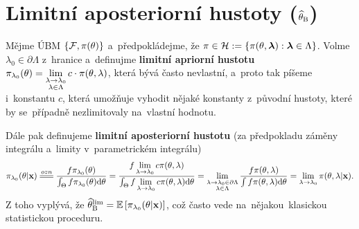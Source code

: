 \section{Limitní aposteriorní hustoty ($\widehat{\theta}_\mathrm{B}$)}
\begin{define}
	Mějme ÚBM $\{\mathcal{F},\pi(\theta)\}$ a~předpokládejme, že $\pi\in\mathcal{H}:=\{\pi(\theta,\boldsymbol{\lambda}):\boldsymbol{\lambda}\in\Lambda\}$. Volme $\lambda_0\in\partial\Lambda$ z~hranice a~definujme \textbf{limitní apriorní hustotu} $\pi_{\lambda_0}(\theta)=\lim\limits_{\substack{
			\lambda\to\lambda_0\\\lambda\in\Lambda	}
	}c\cdot \pi(\theta,\lambda)$, která bývá často nevlastní, a~proto tak píšeme i~konstantu $c$, která umožňuje vyhodit nějaké konstanty z~původní hustoty, které by se~případně nezlimitovaly na~vlastní hodnotu. 
\end{define}

\begin{define}
	Dále pak definujeme \textbf{limitní aposteriorní hustotu} (za předpokladu záměny integrálu a~limity v~parametrickém integrálu) $$\pi_{\lambda_0}(\t|\textbf{x})\equal{ozn}\frac{f\pi_{\lambda_0}(\t)}{\int_\Theta f\pi_{\lambda_0}(\t)\d\t}=\frac{f\lim\limits_{\lambda\to\lambda_0}c\pi(\t,\lambda)}{\int_\Theta f\lim\limits_{\lambda\to\lambda_0}c\pi(\t,\lambda) \d\t}=\lim\limits_{\substack{
			\lambda\to\lambda_0\in\partial\Lambda\\\lambda\in\Lambda	}
	}\frac{f\pi(\t,\lambda)}{\int f\pi(\t,\lambda)\d\t}=\lim\limits_{\lambda\to\lambda_0}\pi(\t,\lambda|\textbf{x}).$$
	Z toho vyplývá, že $\widehat{\theta}_{\mathrm{{\footnotesize B }}}^\mathrm{lim} =\mathbb{E}\left[ \pi_{\lambda_0}(\theta|\textbf{x}) \right]$, což často vede na~nějakou~klasickou statistickou proceduru.
\end{define}

